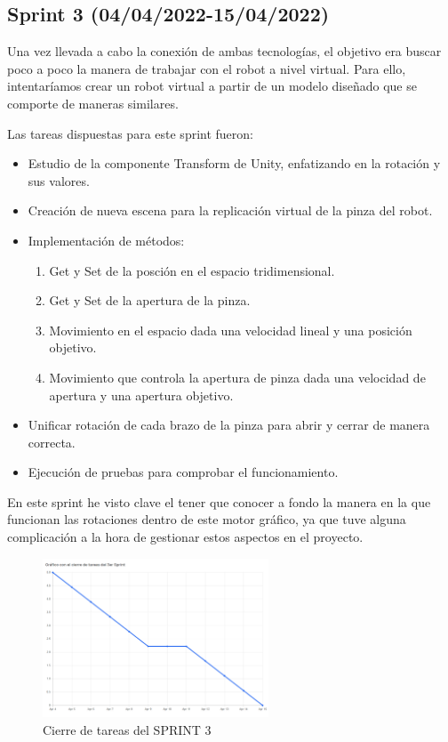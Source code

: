 \subsection{\textbf{Sprint 3 (04/04/2022-15/04/2022)}}
Una vez llevada a cabo la conexión de ambas tecnologías, el objetivo era buscar poco a poco la manera de trabajar con el robot a nivel virtual. Para ello, intentaríamos crear un robot virtual a partir de un modelo diseñado que se comporte de maneras similares. 

Las tareas dispuestas para este sprint fueron:
\begin{itemize}
    \item Estudio de la componente\cite{Componentes} Transform de Unity, enfatizando en la rotación y sus valores.
    \item Creación de nueva escena para la replicación virtual de la pinza del robot.
    \item Implementación de métodos: \begin{enumerate}
        \item Get y Set de la posción en el espacio tridimensional.
        \item Get y Set de la apertura de la pinza.
        \item Movimiento en el espacio dada una velocidad lineal y una posición objetivo.
        \item Movimiento que controla la apertura de pinza dada una velocidad de apertura y una apertura objetivo.
    \end{enumerate}
    \item Unificar rotación de cada brazo de la pinza para abrir y cerrar de manera correcta.
    \item Ejecución de pruebas para comprobar el funcionamiento.
\end{itemize}

En este sprint he visto clave el tener que conocer a fondo la manera en la que funcionan las rotaciones dentro de este motor gráfico, ya que tuve alguna complicación a la hora de gestionar estos aspectos en el proyecto.
\begin{figure}[h]
\centering
\label{Cierre de tareas del SPRINT 3}
\includegraphics[width=0.6\textwidth]{img/sprint3.PNG}
\caption{Cierre de tareas del SPRINT 3}
\end{figure}
